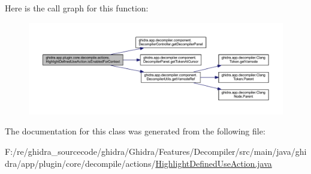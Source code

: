 Here is the call graph for this function\+:
\nopagebreak
\begin{figure}[H]
\begin{center}
\leavevmode
\includegraphics[width=350pt]{classghidra_1_1app_1_1plugin_1_1core_1_1decompile_1_1actions_1_1_highlight_defined_use_action_a583a431104b31a91221412fb9b7c0572_cgraph}
\end{center}
\end{figure}


The documentation for this class was generated from the following file\+:\begin{DoxyCompactItemize}
\item 
F\+:/re/ghidra\+\_\+sourcecode/ghidra/\+Ghidra/\+Features/\+Decompiler/src/main/java/ghidra/app/plugin/core/decompile/actions/\mbox{\hyperlink{_highlight_defined_use_action_8java}{Highlight\+Defined\+Use\+Action.\+java}}\end{DoxyCompactItemize}
